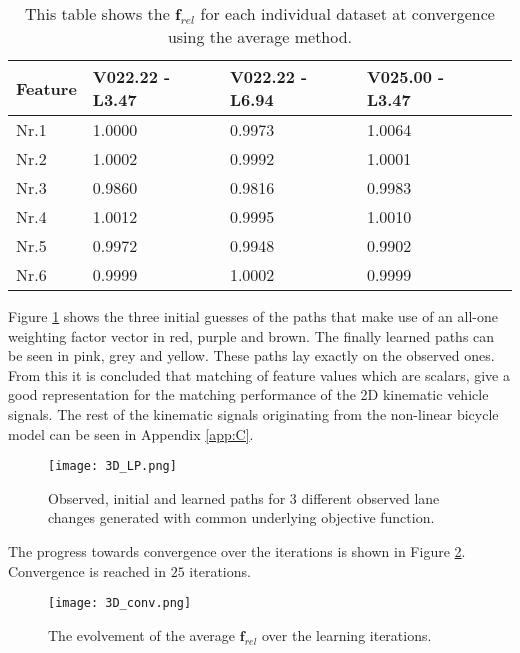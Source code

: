 \begin{table}[h!]
	\centering
	\begin{tabular}{@{}llllr@{}} \toprule
		\textbf{Feature}    & V022.22 - L3.47 & V022.22 - L6.94 & V025.00 - L3.47\\ \midrule
		Nr.1       		  &1.0000        & 0.9973 	    & 1.0064 		\\
		Nr.2              & 1.0002       & 0.9992       & 1.0001       \\
		Nr.3              & 0.9860       & 0.9816       & 0.9983       \\
		Nr.4              & 1.0012       & 0.9995       & 1.0010       \\
		Nr.5              & 0.9972       & 0.9948       & 0.9902       \\
		Nr.6              & 0.9999       & 1.0002       & 0.9999       \\ \bottomrule
	\end{tabular}
	\caption{This table shows the $\bm{f}_{rel}$ for each individual dataset at convergence using the average method.}
	\label{tab:in_av}
\end{table} 
Figure \ref{fig:3D_learned_path} shows the three initial guesses of the paths that make use of an all-one weighting factor vector in red, purple and brown. The finally learned paths can be seen in pink, grey and yellow. These paths lay exactly on the observed ones. From this it is concluded that matching of feature values which are scalars, give a good representation for the matching performance of the 2D kinematic vehicle signals. The rest of the kinematic signals originating from the non-linear bicycle model can be seen in Appendix \ref{app:C}. 

 \begin{figure}[h!]
	\centering
	\texttt{[image: 3D\_LP.png]}
	\caption{Observed, initial and learned paths for 3 different observed lane changes generated with common underlying objective function.}
	\label{fig:3D_learned_path}
\end{figure}
 
The progress towards convergence over the iterations is shown in Figure \ref{fig:3D_conv}. Convergence is reached in $25$ iterations.

\begin{figure}[h!]
	\centering
	\texttt{[image: 3D\_conv.png]}
	\caption{The evolvement of the average $\bm{f}_{rel}$ over the learning iterations.}
	\label{fig:3D_conv}
\end{figure}


